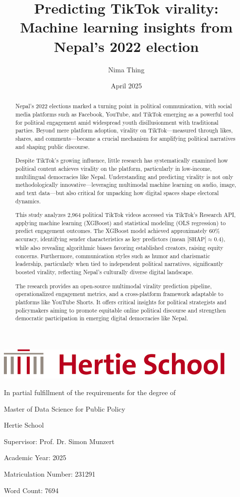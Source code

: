 \documentclass[12pt,a4paper]{report}
\title{Predicting TikTok virality: Machine learning insights from Nepal’s 2022 election }
\author{Nima Thing}
\date{April 2025}
\makeatletter
\renewcommand{\maketitle}{
\begin{titlepage}
\thispagestyle{empty}
\onehalfspacing
\setlength{\parskip}{0.5em}
\setlength{\parindent}{0pt}

\begin{minipage}{0.3\textwidth}
\raggedleft
\vspace*{1cm}
\includegraphics[width=0.9\textwidth]{figures/hertie_logo.png}
\end{minipage}

\begin{center}
\vspace*{2cm}
{\Large\bfseries\@title \par} %
\vspace{1.5cm}

{\normalsize\@author \par} %
\vspace{1cm}

{\normalsize In partial fulfillment of the requirements for the degree of \par}
{\normalsize Master of Data Science for Public Policy \par}
\vspace{0.5cm}

{\normalsize Hertie School \par}
\vspace{0.5cm}

{\normalsize Supervisor: Prof. Dr. Simon Munzert \par}
\vspace{0.5cm}

{\normalsize Academic Year: 2025 \par}
\vspace{0.5cm}

{\normalsize Matriculation Number: 231291 \par}
\vspace{0.5cm}

{\normalsize Word Count: 7694  \par}
\vspace{0.5cm}

{\normalsize\@date \par}
\vspace{1cm}

\end{center}
\end{titlepage}
}
\makeatother
\begin{document}

\maketitle


\begin{abstract}
Nepal’s 2022 elections marked a turning point in political communication, with social media platforms such as Facebook, YouTube, and TikTok emerging as a powerful tool for political engagement amid widespread youth disillusionment with traditional parties. Beyond mere platform adoption, virality on TikTok—measured through likes, shares, and comments—became a crucial mechanism for amplifying political narratives and shaping public discourse. 

Despite TikTok’s growing influence, little research has systematically examined how political content achieves virality on the platform, particularly in low-income, multilingual democracies like Nepal. Understanding and predicting virality is not only methodologically innovative—leveraging multimodal machine learning on audio, image, and text data—but also critical for unpacking how digital spaces shape electoral dynamics.

This study analyzes 2,964 political TikTok videos accessed via TikTok’s Research API, applying machine learning (XGBoost) and statistical modeling (OLS regression) to predict engagement outcomes. The XGBoost model achieved approximately 60\% accuracy, identifying sender characteristics as key predictors (mean $|\text{SHAP}| \approx 0.4$), while also revealing algorithmic biases favoring established creators, raising equity concerns. Furthermore, communication styles such as humor and charismatic leadership, particularly when tied to independent political narratives, significantly boosted virality, reflecting Nepal’s culturally diverse digital landscape.

The research provides an open-source multimodal virality prediction pipeline, operationalized engagement metrics, and a cross-platform framework adaptable to platforms like YouTube Shorts. It offers critical insights for political strategists and policymakers aiming to promote equitable online political discourse and strengthen democratic participation in emerging digital democracies like Nepal.
\end{abstract}
\end{document}
